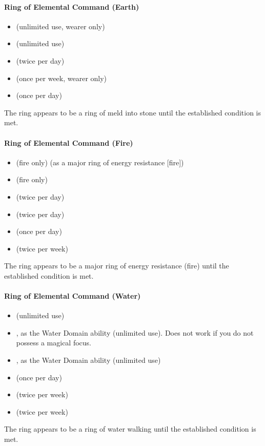\paragraph{Ring of Elemental Command (Earth)}
\begin{itemize}
\item {} (unlimited use, wearer only)
\item {} (unlimited use)
\item {} (twice per day)
\item {} (once per week, wearer only)
\item {} (once per day)
\end{itemize}
The ring appears to be a ring of meld into stone until the established condition is met.

\paragraph{Ring of Elemental Command (Fire)}
\begin{itemize}
\item {} (fire only) (as a major ring of energy resistance [fire])
\item {} (fire only)
\item {} (twice per day)
\item {} (twice per day)
\item {}  (once per day)
\item {} (twice per week)
\end{itemize}
The ring appears to be a major ring of energy resistance (fire) until the established condition is met.

\paragraph{Ring of Elemental Command (Water)}
\begin{itemize}
\item {} (unlimited use)
\item {}, as the Water Domain ability (unlimited use). Does not work if you do not possess a magical focus.
\item {}, as the Water Domain ability (unlimited use)
\item {} (once per day)
\item {} (twice per week)
\item {} (twice per week)
\end{itemize}
The ring appears to be a ring of water walking until the established condition is met.

